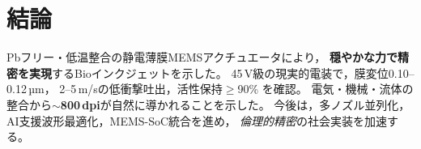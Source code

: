 \section{結論}
Pbフリー・低温整合の静電薄膜MEMSアクチュエータにより，
\textbf{穏やかな力で精密を実現}するBioインクジェットを示した。
45\,V級の現実的電装で，膜変位0.10–0.12\,µm，
2–5\,m/sの低衝撃吐出，活性保持$\ge$90\% を確認。
電気・機械・流体の整合から\textbf{$\sim$800\,dpi}が自然に導かれることを示した。
今後は，多ノズル並列化，AI支援波形最適化，MEMS-SoC統合を進め，
\emph{倫理的精密}の社会実装を加速する。
